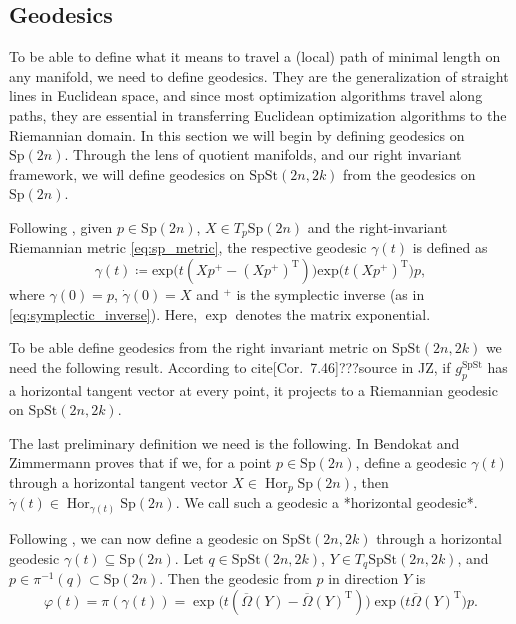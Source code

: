 \subsection{Geodesics}
To be able to define what it means to travel a (local) path of minimal length on any manifold, we need to define geodesics. They are the generalization of straight lines in Euclidean space, and since most optimization algorithms travel along paths, they are essential in transferring Euclidean optimization algorithms to the Riemannian domain. In this section we will begin by defining geodesics on $\mathrm{Sp}(2n)$. Through the lens of quotient manifolds, and our right invariant framework, we will define geodesics on $\mathrm{SpSt}(2n, 2k)$ from the geodesics on $\mathrm{Sp}(2n)$.

Following \cite[Prop.~2.1]{BendokatZimmermann2021}, given $p\in \mathrm{Sp}(2n)$,  $X\in T_{p}\mathrm{Sp}(2n)$ and the right-invariant Riemannian metric \eqref{eq:sp_metric}, the respective geodesic $\gamma(t)$ is defined as
\begin{equation*}
    \gamma(t)\coloneqq \mathrm{exp}\big(t(Xp^{+}-(Xp^{+}) ^{\mathrm{T}})\big)\mathrm{exp}\big(t(Xp^{+})^{\mathrm{T}}\big)p,
\end{equation*}
where $\gamma(0)=p$, $\dot{\gamma}(0)=X$ and $^{+}$ is the symplectic inverse (as in \eqref{eq:symplectic_inverse}). Here, $\operatorname{\exp}$ denotes the matrix exponential. 

To be able define geodesics from the right invariant metric on $\mathrm{SpSt}(2n, 2k)$ we need the following result. According to cite[Cor.~7.46]{???source in JZ}, if $g_{p}^\mathrm{SpSt}$ has a horizontal tangent vector at every point, it projects to a Riemannian geodesic on $\mathrm{SpSt}(2n, 2k)$. 

The last preliminary definition we need is the following. In \cite[Lemma 3.11]{BendokatZimmermann2021} Bendokat and Zimmermann proves that if we, for a point $p \in \mathrm{Sp}(2n)$, define a geodesic $\gamma(t)$ through a horizontal tangent vector $X\in \operatorname{Hor}_{p}\mathrm{Sp}(2n)$, then $\dot{\gamma}(t)\in \operatorname{Hor}_{\gamma(t)}\mathrm{Sp}(2n)$. We call such a geodesic a *horizontal geodesic*.

Following \cite[Prop. 3.12]{BendokatZimmermann2021}, we can now define a geodesic on $\mathrm{SpSt}(2n, 2k)$ through a horizontal geodesic $\gamma(t)\subseteq\mathrm{Sp}(2n)$. Let $q\in \mathrm{SpSt}(2n, 2k)$, $Y\in T_{q}\mathrm{SpSt}(2n, 2k)$, and $p\in \pi^{-1}(q)\subset \mathrm{Sp}(2n)$. Then the geodesic from $p$ in direction $Y$ is
%
\begin{equation}\label{eq:geodesic_spst}
\varphi(t)=\pi(\gamma(t))=\exp\big(t(\overline{\Omega}(Y)-\overline{\Omega}(Y)^{\mathrm{T}})\big)\exp\big(t \overline{\Omega}(Y)^{\mathrm{T}}\big)p.
\end{equation}
%